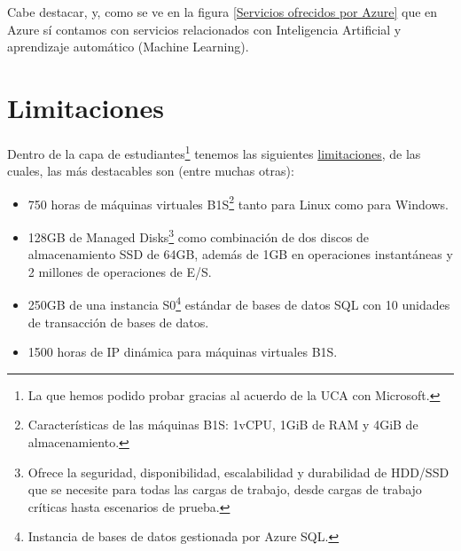 Cabe destacar, y, como se ve en la figura \ref{Servicios ofrecidos por Azure} que en Azure sí contamos con servicios relacionados con Inteligencia Artificial y aprendizaje automático (Machine Learning).

\section{Limitaciones}
Dentro de la capa de estudiantes\footnote{La que hemos podido probar gracias al acuerdo de la UCA con Microsoft.} tenemos las siguientes \href{https://azure.microsoft.com/es-es/free/free-account-students-faq/}{limitaciones}, de las cuales, las más destacables son (entre muchas otras):
\begin{itemize}
	\item 750 horas de máquinas virtuales B1S\footnote{Características de las máquinas B1S: 1vCPU, 1GiB de RAM y 4GiB de almacenamiento.} tanto para Linux como para Windows.
	\item 128GB de Managed Disks\footnote{Ofrece la seguridad, disponibilidad, escalabilidad y durabilidad de HDD/SSD que se necesite para todas las cargas de trabajo, desde cargas de trabajo críticas hasta escenarios de prueba.} como combinación de dos discos de almacenamiento SSD de 64GB, además de 1GB en operaciones instantáneas y 2 millones de operaciones de E/S.
	\item 250GB de una instancia S0\footnote{Instancia de bases de datos gestionada por Azure SQL.} estándar de bases de datos SQL con 10 unidades de transacción de bases de datos.
	\item 1500 horas de IP dinámica para máquinas virtuales B1S.
\end{itemize}